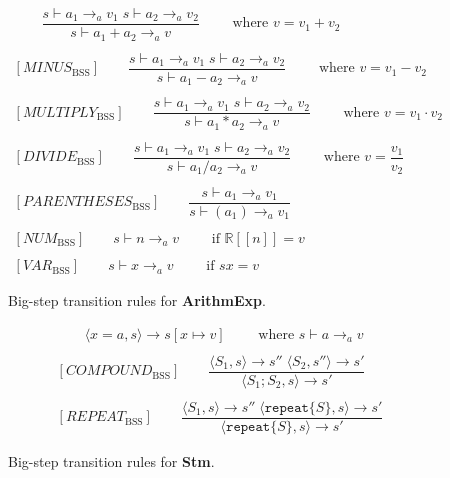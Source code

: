 \begin{figure}[htbp]
	\centering
	\begin{gather*}
		[PLUS_\text{BSS}] 
		\qquad \dfrac
		{s \vdash a_1 \rightarrow_a v_1 \; s \vdash a_2 \rightarrow_a v_2}
		{s \vdash a_1 + a_2 \rightarrow_a v}
		\qquad \text{ where }v = v_1 + v_2
		\\
		\\
		[MINUS_\text{BSS}] 
		\qquad \dfrac
		{s \vdash a_1 \rightarrow_a v_1 \; s \vdash a_2 \rightarrow_a v_2}
		{s \vdash a_1 - a_2 \rightarrow_a v}
		\qquad \text{ where }v = v_1 - v_2
		\\
		\\
		[MULTIPLY_\text{BSS}] 
		\qquad \dfrac
		{s \vdash a_1 \rightarrow_a v_1 \; s \vdash a_2 \rightarrow_a v_2}
		{s \vdash a_1 * a_2 \rightarrow_a v}
		\qquad \text{ where }v = v_1 \cdot v_2
		\\
		\\
		[DIVIDE_\text{BSS}] 
		\qquad \dfrac
		{s \vdash a_1 \rightarrow_a v_1 \; s \vdash a_2 \rightarrow_a v_2}
		{s \vdash a_1 / a_2 \rightarrow_a v}
		\qquad \text{ where }v = \dfrac{v_1}{v_2}
		\\
		\\
		[PARENTHESES_\text{BSS}] 
		\qquad \dfrac
		{s \vdash a_1 \rightarrow_a v_1}
		{s \vdash (a_1) \rightarrow_a v_1}
		\\
		\\
		[NUM_\text{BSS}] 
		\qquad s \vdash n \rightarrow_a v
		\qquad \text{ if } \mathbb{R}[\![n]\!] = v
		\\
		\\
		[VAR_\text{BSS}] 
		\qquad s \vdash x \rightarrow_a v
		\qquad \text{ if } sx = v
	\end{gather*}
	\caption{Big-step transition rules for \textbf{ArithmExp}.}
\end{figure}

\begin{figure}[htbp]
	\centering
	\begin{gather*}
		[ASSIGNMENT_\text{BSS}] 
		\qquad \langle x=a,s\rangle \rightarrow s[x\mapsto v]
		\qquad \text{ where }s\vdash a \rightarrow_a v
		\\
		\\
		[COMPOUND_\text{BSS}] 
		\qquad \dfrac
		{\langle S_1, s\rangle \rightarrow s'' \;\langle S_2, s''\rangle \rightarrow s'}
		{\langle S_1;S_2,s\rangle\rightarrow s'}
		\\
		\\
		[REPEAT_\text{BSS}] 
		\qquad \dfrac
		{\langle S_1, s\rangle \rightarrow s'' \;\langle \texttt{repeat} \{S\}, s\rangle \rightarrow s'}
		{\langle \texttt{repeat} \{S\}, s\rangle\rightarrow s'}
	\end{gather*}
	\caption{Big-step transition rules for \textbf{Stm}.}
\end{figure}